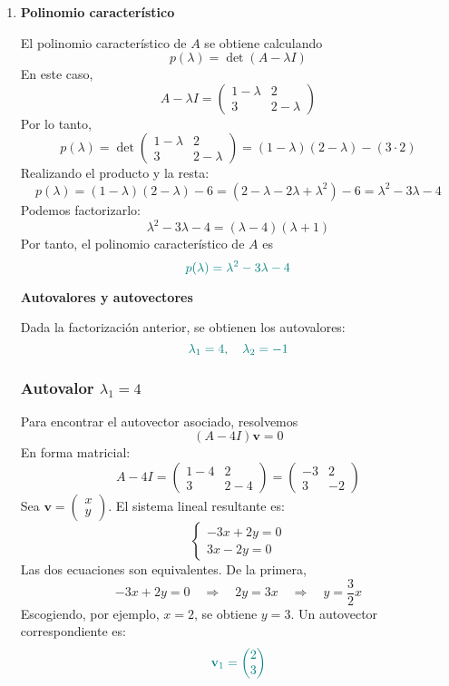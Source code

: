 \documentclass{article}
\begin{document}
\begin{enumerate}[label=\textbf{\alph*)}]
    \item \textbf{Polinomio característico}
    
El polinomio característico de \( A \) se obtiene calculando
\[
p(\lambda) = \det(A - \lambda I)
\]
En este caso,
\[
A - \lambda I =
\begin{pmatrix}
1 - \lambda & 2 \\
3 & 2 - \lambda
\end{pmatrix}
\]
Por lo tanto,
\[
p(\lambda) 
= \det\begin{pmatrix}
1 - \lambda & 2 \\
3 & 2 - \lambda
\end{pmatrix}
= (1 - \lambda)(2 - \lambda) - (3 \cdot 2)
\]
Realizando el producto y la resta:
\[
p(\lambda) = (1 - \lambda)(2 - \lambda) - 6 
= (2 - \lambda - 2\lambda + \lambda^2) - 6 
= \lambda^2 - 3\lambda - 4
\]
Podemos factorizarlo:
\[
\lambda^2 - 3\lambda - 4 = (\lambda - 4)(\lambda + 1)
\]
Por tanto, el polinomio característico de \( A \) es
\[\color{teal}
p(\lambda) = \lambda^2 - 3\lambda - 4
\]

\textbf{Autovalores y autovectores}

Dada la factorización anterior, se obtienen los autovalores:
\[\color{teal}
\lambda_1 = 4, 
\quad\color{teal}
\lambda_2 = -1
\]

\subsubsection*{Autovalor \( \lambda_1 = 4 \)}

Para encontrar el autovector asociado, resolvemos
\[
(A - 4I)\mathbf{v} = 0
\]
En forma matricial:
\[
A - 4I = 
\begin{pmatrix}
1 - 4 & 2 \\
3 & 2 - 4
\end{pmatrix}
=
\begin{pmatrix}
-3 & 2 \\
3 & -2
\end{pmatrix}
\]
Sea \( \mathbf{v} = \begin{pmatrix} x \\ y \end{pmatrix} \). El sistema lineal resultante es:
\[
\begin{cases}
-3x + 2y = 0 \\
3x - 2y = 0
\end{cases}
\]
Las dos ecuaciones son equivalentes. De la primera,
\[
-3x + 2y = 0 
\quad \Longrightarrow \quad
2y = 3x 
\quad \Longrightarrow \quad
y = \frac{3}{2} x
\]
Escogiendo, por ejemplo, \( x = 2 \), se obtiene \( y = 3 \). Un autovector correspondiente es:
\[\color{teal}
\mathbf{v}_1 = \begin{pmatrix} 2 \\ 3 \end{pmatrix}
\]


\end{enumerate}
\end{document}
